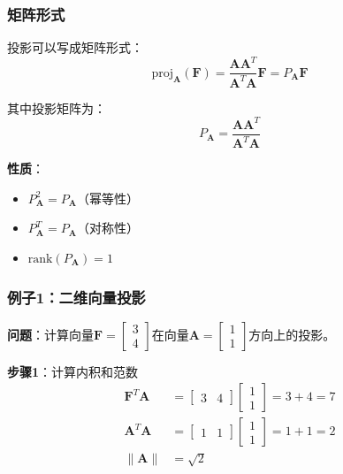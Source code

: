 \documentclass[12pt,a4paper]{article}
\begin{document}
\subsubsection{矩阵形式}

投影可以写成矩阵形式：
\begin{equation}
\text{proj}_{\bm{A}}(\bm{F}) = \frac{\bm{A} \bm{A}^T}{\bm{A}^T \bm{A}} \bm{F} = P_{\bm{A}} \bm{F}
\label{eq:projection_matrix}
\end{equation}

其中投影矩阵为：
\begin{equation}
P_{\bm{A}} = \frac{\bm{A} \bm{A}^T}{\bm{A}^T \bm{A}}
\label{eq:projection_matrix_def}
\end{equation}

\textbf{性质}：
\begin{itemize}
\item $P_{\bm{A}}^2 = P_{\bm{A}}$（幂等性）
\item $P_{\bm{A}}^T = P_{\bm{A}}$（对称性）
\item $\text{rank}(P_{\bm{A}}) = 1$
\end{itemize}

\subsubsection{例子1：二维向量投影}

\textbf{问题}：计算向量$\bm{F} = \begin{bmatrix} 3 \\ 4 \end{bmatrix}$在向量$\bm{A} = \begin{bmatrix} 1 \\ 1 \end{bmatrix}$方向上的投影。

\textbf{步骤1}：计算内积和范数
\begin{align}
\bm{F}^T \bm{A} &= \begin{bmatrix} 3 & 4 \end{bmatrix} \begin{bmatrix} 1 \\ 1 \end{bmatrix} = 3 + 4 = 7 \\
\bm{A}^T \bm{A} &= \begin{bmatrix} 1 & 1 \end{bmatrix} \begin{bmatrix} 1 \\ 1 \end{bmatrix} = 1 + 1 = 2 \\
\|\bm{A}\| &= \sqrt{2}
\end{align}
\end{document}
